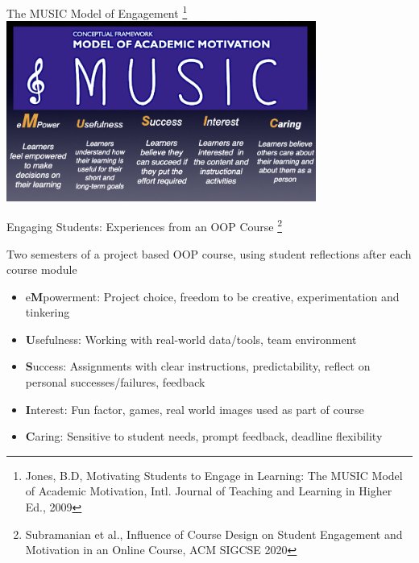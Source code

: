 \documentclass[aspectratio=169]{beamer}
\begin{document}
\begin{frame}{The MUSIC Model of Engagement}
\footnote{ Jones, B.D, Motivating Students to Engage in Learning: The MUSIC Model of Academic Motivation, Intl. Journal of Teaching and Learning in Higher Ed., 2009}
\centering\includegraphics[width=4in]{figs/music_model.png}
\end{frame}
\begin{frame}{Engaging Students: Experiences from an OOP Course
\footnote{Subramanian et al., Influence of Course Design on Student Engagement and Motivation in an Online Course, ACM SIGCSE 2020}}
\begin{block}{Two semesters of a project based OOP course, using
student  reflections after each course module}
\end{block}
\begin{itemize} 
	\item e\textbf{M}powerment: Project choice, freedom to be creative, 
		experimentation and tinkering
	\item \textbf{U}sefulness: Working with real-world data/tools, team
		environment
	\item \textbf{S}uccess: Assignments with clear instructions, predictability,
		reflect on personal successes/failures, feedback
	\item \textbf{I}nterest: Fun factor,  games, real world images used
		as part of course
	\item \textbf{C}aring: Sensitive to student needs, prompt feedback, deadline
		flexibility
\end{itemize}
\end{frame}
\end{document}
